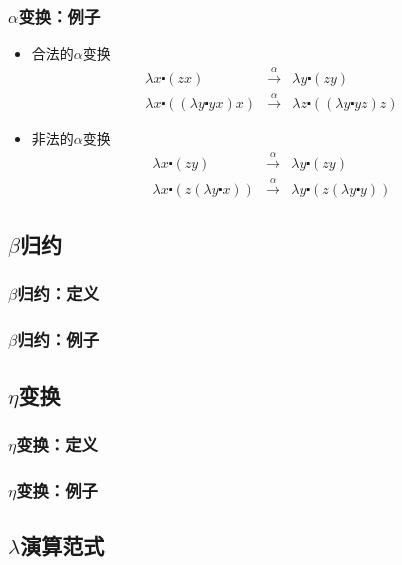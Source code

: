 \documentclass[CJKutf8,compress,hyperref]{beamer}
\begin{document}
\begin{CJK}{UTF8}{song}
\begin{frame}
  \frametitle{$\alpha$变换：例子} 
  \begin{itemize}
  \item 合法的$\alpha$变换 
    \begin{eqnarray*}
      \lambda x \centerdot (zx) & \stackrel{\alpha}{\longrightarrow} & \lambda y \centerdot (zy) \\ 
      \lambda x \centerdot ((\lambda y \centerdot yx) x) & \stackrel{\alpha}{\longrightarrow} & \lambda z  \centerdot ((\lambda y \centerdot yz) z) 
    \end{eqnarray*}
  \item 非法的$\alpha$变换
    \begin{eqnarray*}      
      \lambda x \centerdot (zy) & \stackrel{\alpha}{\longrightarrow} &  \lambda y \centerdot (zy) \\
      \lambda x \centerdot (z (\lambda y \centerdot x))  & \stackrel{\alpha}{\longrightarrow} & \lambda y \centerdot (z (\lambda y \centerdot y)) 
    \end{eqnarray*}
  \end{itemize}
\end{frame} 

\subsection{$\beta$归约}
\begin{frame}
  \frametitle{$\beta$归约：定义} 
\end{frame} 

\begin{frame}
  \frametitle{$\beta$归约：例子} 
\end{frame} 

\subsection{$\eta$变换}
\begin{frame}
  \frametitle{$\eta$变换：定义} 
\end{frame} 

\begin{frame}
  \frametitle{$\eta$变换：例子} 
\end{frame} 

\subsection{$\lambda$演算范式}


\end{CJK}
\end{document}
